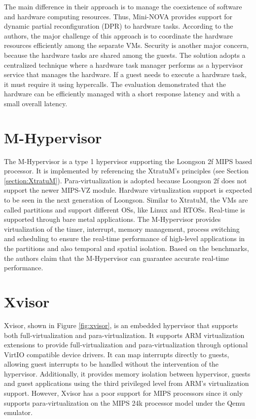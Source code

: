 The main difference in their approach is to  manage the coexistence of software and hardware computing resources. Thus, Mini-NOVA provides support for dynamic partial reconfiguration (DPR) to hardware tasks. According to the authors, the major challenge of this approach is to coordinate the hardware resources efficiently among the separate VMs. Security is another major concern, because the hardware tasks are shared among the guests. The solution adopts a centralized technique where a hardware task manager performs as a hypervisor service that manages the hardware. If a guest needs to execute a hardware task, it must require it using hypercalls. The evaluation demonstrated that the hardware can be efficiently managed with a short response latency and with a small overall latency. 


\section{M-Hypervisor}
\label{section:mhyper}

The M-Hypervisor \cite{rui2013} is a type 1 hypervisor supporting the Loongson 2f \cite{loogson2f} MIPS based processor. It is implemented by referencing the XtratuM's principles (see Section \ref{section:XtratuM}). Para-virtualization is adopted because Loongson 2f does not support the newer MIPS-VZ module. Hardware virtualization support is expected to be seen in the next generation of Loongson. Similar to XtratuM, the VMs are called partitions and support different OSs, like Linux and RTOSs. Real-time is supported through bare metal applications. The M-Hypervisor provides virtualization of the timer, interrupt, memory management, process switching and scheduling to ensure the real-time performance of high-level applications in the partitions and also temporal and spatial isolation. Based on the benchmarks, the authors claim that the M-Hypervisor can guarantee accurate real-time performance.


\section{Xvisor}
\label{section:xvisor}

Xvisor, shown in Figure \ref{fig:xvisor}, is an embedded hypervisor that supports both full-virtualization and para-virtualization\cite{patel2015}. It supports ARM virtualization extensions to provide full-virtualization and para-virtualization through optional VirtIO compatible device drivers. It can map interrupts directly to guests, allowing guest interrupts to be handled without the intervention of the hypervisor. Additionally, it provides memory isolation between hypervisor, guests and guest applications using the third privileged level from ARM's virtualization support. However, Xvisor has a poor support for MIPS processors since it only supports para-virtualization on the MIPS 24k processor model under the Qemu emulator.

